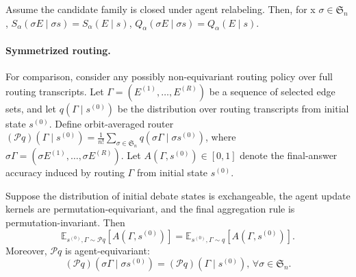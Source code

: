 \begin{theorem}
\label{thm:armad-equivariant}
Assume the candidate family is closed under agent relabeling. Then, for x
$\sigma\in\mathfrak S_n$,
    $S_\alpha(\sigma E\mid \sigma s)=S_\alpha(E\mid s)$, %
    $Q_\alpha(\sigma E\mid \sigma s)=Q_\alpha(E\mid s)$.
\end{theorem}



\paragraph{Symmetrized routing.}
For comparison, consider any possibly non-equivariant routing policy over full
routing transcripts. Let
\(
    \Gamma=(E^{(1)},\ldots,E^{(R)})
\)
be a sequence of selected edge sets, and let $q(\Gamma\mid s^{(0)})$ be the
distribution over routing transcripts from initial state $s^{(0)}$. Define
orbit-averaged router
\(
    (\mathcal P q)(\Gamma\mid s^{(0)})
    =
    \frac{1}{n!}
    \sum_{\sigma\in\mathfrak S_n}
    q(\sigma\Gamma\mid \sigma s^{(0)})\),
where
$\sigma\Gamma=(\sigma E^{(1)},\ldots,\sigma E^{(R)})$.
Let $A(\Gamma,s^{(0)})\in[0,1]$ denote the final-answer accuracy induced by
routing $\Gamma$ from initial state $s^{(0)}$.

\begin{theorem}
\label{thm:accuracy-preservation}
Suppose the distribution of initial debate states is exchangeable, the agent
update kernels are permutation-equivariant, and the final aggregation rule is
permutation-invariant. Then
\[
    \mathbb E_{s^{(0)},\Gamma\sim \mathcal Pq}
    \left[A(\Gamma,s^{(0)})\right]
    =
    \mathbb E_{s^{(0)},\Gamma\sim q}
    \left[A(\Gamma,s^{(0)})\right].
\]
Moreover, $\mathcal Pq$ is agent-equivariant:
\[
    (\mathcal Pq)(\sigma\Gamma\mid \sigma s^{(0)})
    =
    (\mathcal Pq)(\Gamma\mid s^{(0)})\text{, }
    \forall \sigma\in\mathfrak S_n .
\]
\end{theorem}

